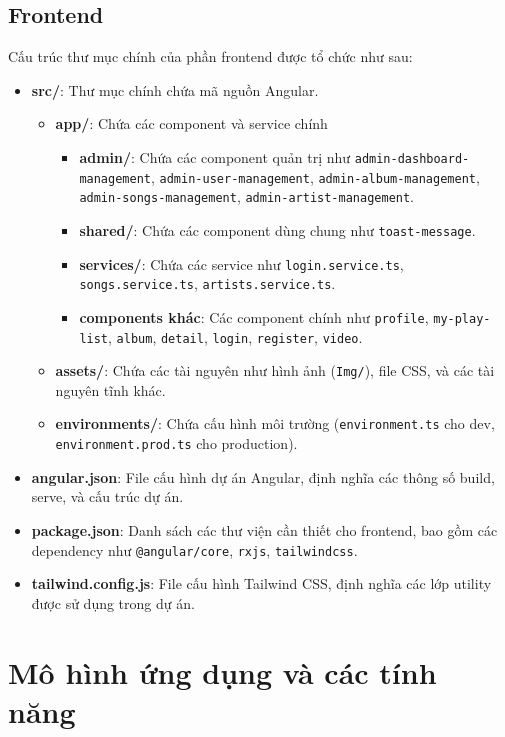 \subsection{Frontend}
Cấu trúc thư mục chính của phần frontend được tổ chức như sau:
\begin{itemize}
    \item \textbf{src/}: Thư mục chính chứa mã nguồn Angular.
    \begin{itemize}
        \item \textbf{app/}: Chứa các component và service chính
        \begin{itemize}
            \item \textbf{admin/}: Chứa các component quản trị như \texttt{admin-dashboard-management}, \texttt{admin-user-management}, \texttt{admin-album-management}, \texttt{admin-songs-management}, \texttt{admin-artist-management}.
            \item \textbf{shared/}: Chứa các component dùng chung như \texttt{toast-message}.
            \item \textbf{services/}: Chứa các service như \texttt{login.service.ts}, \texttt{songs.service.ts}, \texttt{artists.service.ts}.
            \item \textbf{components khác}: Các component chính như \texttt{profile}, \texttt{my-play-list}, \texttt{album}, \texttt{detail}, \texttt{login}, \texttt{register}, \texttt{video}.
        \end{itemize}
        \item \textbf{assets/}: Chứa các tài nguyên như hình ảnh (\texttt{Img/}), file CSS, và các tài nguyên tĩnh khác.
        \item \textbf{environments/}: Chứa cấu hình môi trường (\texttt{environment.ts} cho dev, \texttt{environment.prod.ts} cho production).
    \end{itemize}
    \item \textbf{angular.json}: File cấu hình dự án Angular, định nghĩa các thông số build, serve, và cấu trúc dự án.
    \item \textbf{package.json}: Danh sách các thư viện cần thiết cho frontend, bao gồm các dependency như \texttt{@angular/core}, \texttt{rxjs}, \texttt{tailwindcss}.
    \item \textbf{tailwind.config.js}: File cấu hình Tailwind CSS, định nghĩa các lớp utility được sử dụng trong dự án.
\end{itemize}

\section{Mô hình ứng dụng và các tính năng}
